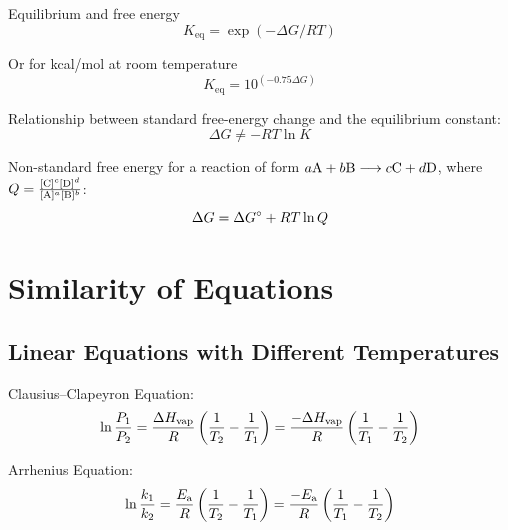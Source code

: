 \documentclass[10pt]{article}
\begin{document}
Equilibrium and free energy
\begin{equation*}
K_{\text{eq}} = \exp (-\Delta G/RT) 
\end{equation*}

Or for kcal/mol at room temperature
\begin{equation*}
K_{\text{eq}} = 10^{(-0.75 \Delta G)}
\end{equation*}

Relationship between standard free-energy change and the equilibrium constant:
\begin{equation*}
\Delta G\not = -RT \ln K
\end{equation*}

Non-standard free energy for a reaction of form $a\textnormal{A}+b\textnormal{B} \longrightarrow c\textnormal{C}+d\textnormal{D}$, where $Q = \frac{[\textnormal{C}]^c[\textnormal{D}]^d}{[\textnormal{A}]^a[\textnormal{B}]^b}$:
\begin{equation*}
\Delta G = \Delta G\not + RT\ln Q
\end{equation*}


\section{Similarity of Equations}

\subsection{Linear Equations with Different Temperatures}

Clausius--Clapeyron Equation:
\begin{equation*}
\ln \frac{P_1}{P_2} = \frac{\Delta H_\textnormal{vap}}{R}\left(\frac{1}{T_2} - \frac{1}{T_1}\right) = \frac{-\Delta H_\textnormal{vap}}{R}\left(\frac{1}{T_1} - \frac{1}{T_2}\right)
\end{equation*}

Arrhenius Equation:
\begin{equation*}
\ln \frac{k_1}{k_2} = \frac{E_\textnormal{a}}{R}\left(\frac{1}{T_2} - \frac{1}{T_1}\right) = \frac{-E_\textnormal{a}}{R}\left(\frac{1}{T_1}-\frac{1}{T_2}\right)
\end{equation*}
\end{document}
